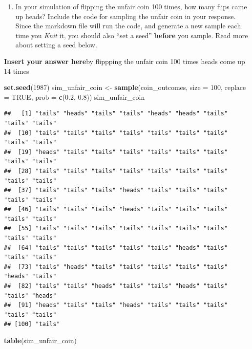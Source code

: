 \documentclass[
]{article}
\newenvironment{Shaded}{\begin{snugshade}}{\end{snugshade}}
\newcommand{\AttributeTok}[1]{\textcolor[rgb]{0.13,0.29,0.53}{#1}}
\newcommand{\ConstantTok}[1]{\textcolor[rgb]{0.56,0.35,0.01}{#1}}
\newcommand{\DecValTok}[1]{\textcolor[rgb]{0.00,0.00,0.81}{#1}}
\newcommand{\FloatTok}[1]{\textcolor[rgb]{0.00,0.00,0.81}{#1}}
\newcommand{\FunctionTok}[1]{\textcolor[rgb]{0.13,0.29,0.53}{\textbf{#1}}}
\newcommand{\NormalTok}[1]{#1}
\newcommand{\OtherTok}[1]{\textcolor[rgb]{0.56,0.35,0.01}{#1}}
\providecommand{\tightlist}{%
  \setlength{\itemsep}{0pt}\setlength{\parskip}{0pt}}
\begin{document}
\begin{enumerate}
\def\labelenumi{\arabic{enumi}.}
\setcounter{enumi}{2}
\tightlist
\item
  In your simulation of flipping the unfair coin 100 times, how many
  flips came up heads? Include the code for sampling the unfair coin in
  your response. Since the markdown file will run the code, and generate
  a new sample each time you \emph{Knit} it, you should also ``set a
  seed'' \textbf{before} you sample. Read more about setting a seed
  below.
\end{enumerate}

\textbf{Insert your answer here}by flippping the unfair coin 100 times
heads come up 14 times

\begin{Shaded}
\begin{Highlighting}[]
\FunctionTok{set.seed}\NormalTok{(}\DecValTok{1987}\NormalTok{)}
\NormalTok{sim\_unfair\_coin }\OtherTok{\textless{}{-}} \FunctionTok{sample}\NormalTok{(coin\_outcomes, }\AttributeTok{size =} \DecValTok{100}\NormalTok{, }\AttributeTok{replace =} \ConstantTok{TRUE}\NormalTok{, }\AttributeTok{prob =} \FunctionTok{c}\NormalTok{(}\FloatTok{0.2}\NormalTok{, }\FloatTok{0.8}\NormalTok{))}
\NormalTok{sim\_unfair\_coin}
\end{Highlighting}
\end{Shaded}

\begin{verbatim}
##   [1] "tails" "heads" "tails" "tails" "heads" "heads" "tails" "tails" "tails"
##  [10] "tails" "tails" "tails" "tails" "tails" "tails" "tails" "tails" "tails"
##  [19] "heads" "tails" "tails" "tails" "tails" "tails" "tails" "tails" "tails"
##  [28] "tails" "tails" "tails" "tails" "tails" "tails" "tails" "tails" "tails"
##  [37] "tails" "tails" "tails" "heads" "tails" "tails" "tails" "tails" "tails"
##  [46] "tails" "tails" "tails" "heads" "tails" "tails" "tails" "tails" "tails"
##  [55] "tails" "tails" "tails" "tails" "tails" "tails" "tails" "tails" "tails"
##  [64] "tails" "tails" "tails" "tails" "tails" "heads" "tails" "tails" "tails"
##  [73] "tails" "heads" "tails" "tails" "tails" "tails" "tails" "heads" "tails"
##  [82] "tails" "tails" "heads" "tails" "tails" "heads" "tails" "tails" "heads"
##  [91] "heads" "tails" "tails" "heads" "tails" "tails" "tails" "tails" "tails"
## [100] "tails"
\end{verbatim}

\begin{Shaded}
\begin{Highlighting}[]
\FunctionTok{table}\NormalTok{(sim\_unfair\_coin)}
\end{Highlighting}
\end{Shaded}
\end{document}
